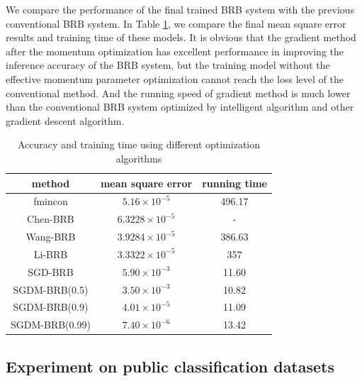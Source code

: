 \documentclass{ieeeaccess}
\begin{document}
We compare the performance of the final trained BRB system with the previous conventional BRB system.
In Table \ref{tab3}, we compare the final mean square error results and training time of these models.
It is obvious that the gradient method after the momentum optimization has excellent performance in improving the inference accuracy of the BRB system,
but the training model without the effective momentum parameter optimization cannot reach the loss level of the conventional method.
And the running speed of gradient method is much lower than the conventional BRB system optimized by intelligent algorithm and other gradient descent algorithm.

\begin{table}
    \caption{Accuracy and training time using different optimization algorithms}
    \centering
    \label{tab3}
    \begin{tabular}{ccc}
        \hline
        method         & mean square error     & running time \\
        \hline
        fmincon        & $5.16\times10^{-5}$   & 496.17       \\
        Chen-BRB       & $6.3228\times10^{-5}$ & -            \\
        Wang-BRB       & $3.9284\times10^{-5}$ & 386.63       \\
        Li-BRB         & $3.3322\times10^{-5}$ & 357          \\
        SGD-BRB        & $5.90\times10^{-3}$   & 11.60        \\
        SGDM-BRB(0.5)  & $3.50\times10^{-3}$   & 10.82        \\
        SGDM-BRB(0.9)  & $4.01\times10^{-5}$   & 11.09        \\
        SGDM-BRB(0.99) & $7.40\times10^{-6}$   & 13.42        \\
        \hline
    \end{tabular}
\end{table}

\subsection{Experiment on public classification datasets}
\end{document}
